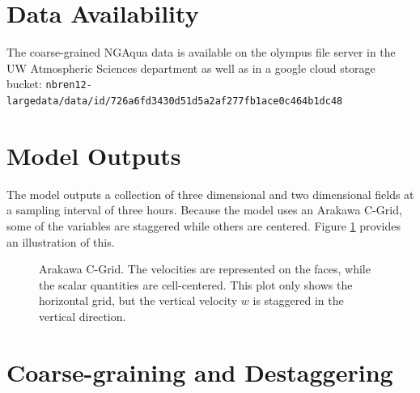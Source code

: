\documentclass{report}
\begin{document}


\section{Data Availability}

The coarse-grained NGAqua data is available on the olympus file server in the UW Atmospheric Sciences department as well as in a google cloud storage bucket:
\verb|nbren12-largedata/data/id/726a6fd3430d51d5a2af277fb1ace0c464b1dc48|

\section{Model Outputs}

The model outputs a collection of three dimensional and two dimensional fields
at a sampling interval of three hours. 
Because the model uses an Arakawa C-Grid, some of the variables are staggered
while others are centered. 
Figure \ref{fig:arakawa-c-grid} provides an illustration of this.

\begin{figure}
  \centering


  \caption{Arakawa C-Grid. 
    The velocities are represented on the faces, while the scalar quantities are
    cell-centered. 
    This plot only shows the horizontal grid, but the vertical velocity $w$ is
    staggered in the vertical direction.}
  \label{fig:arakawa-c-grid}
\end{figure}


\section{Coarse-graining and Destaggering}
\label{sec:post-processing}
\end{document}
